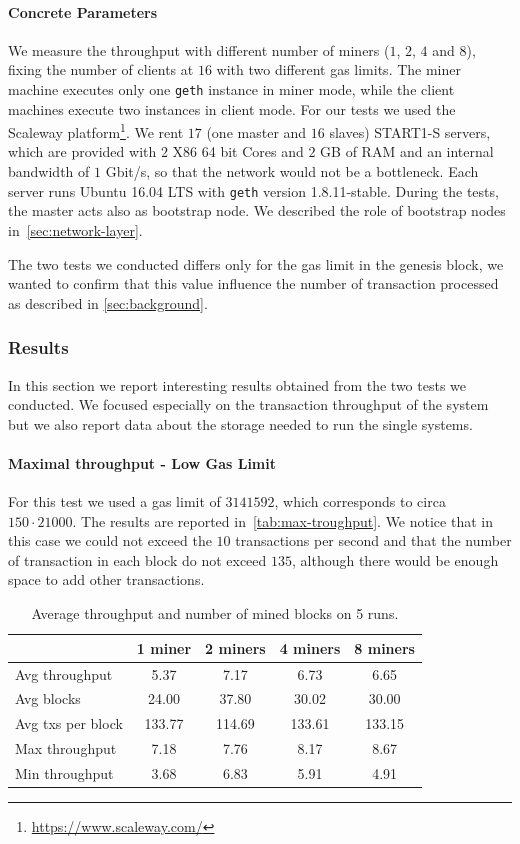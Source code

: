 \paragraph{Concrete Parameters}
We measure the throughput with different number of miners ($1$, $2$, $4$ and
$8$), fixing the number of clients at $16$ with two different gas limits. The
miner machine executes only one \texttt{geth} instance in miner mode, while the
client machines execute two instances in client mode. For our tests we used the
Scaleway platform\footnote{\url{https://www.scaleway.com/}}. We rent $17$ (one
master and $16$ slaves) START1-S servers, which are provided with $2$ X86 64 bit
Cores and $2$ GB of RAM and an internal bandwidth of $1$ Gbit/s, so that the
network would not be a bottleneck. Each server runs Ubuntu 16.04 LTS with
\texttt{geth} version 1.8.11-stable. During the tests, the master acts also as
bootstrap node. We described the role of bootstrap nodes
in~\autoref{sec:network-layer}.

The two tests we conducted differs only for the gas limit in the genesis block,
we wanted to confirm that this value influence the number of transaction
processed as described in \autoref{sec:background}.


\subsubsection{Results}

In this section we report interesting results obtained from the two tests we
conducted. We focused especially on the transaction throughput of the system but
we also report data about the storage needed to run the single systems.

\paragraph{Maximal throughput - Low Gas Limit}
\label{sec:max-troughput}
For this test we used a gas limit of $3141592$, which corresponds to circa $150
\cdot 21000$. The results are reported in~\autoref{tab:max-troughput}. We notice
that in this case we could not exceed the $10$ transactions per second and that
the number of transaction in each block do not exceed $135$, although there
would be enough space to add other transactions.

\begin{table}[h!]
  \centering
  \begin{tabular}{l | cccc}
    & 1 miner & 2 miners & 4 miners & 8 miners \\ \hline
    Avg throughput & 5.37 & 7.17 & 6.73 & 6.65 \\
    Avg blocks & 24.00 & 37.80 & 30.02 & 30.00 \\
    Avg txs per block & 133.77 & 114.69 & 133.61 & 133.15 \\
    Max throughput & 7.18 & 7.76 & 8.17 & 8.67 \\
    Min throughput & 3.68 & 6.83 & 5.91 & 4.91 \\
  \end{tabular}
  \caption{Average throughput and number of mined blocks on 5 runs.}
  \label{tab:max-troughput}
\end{table}


